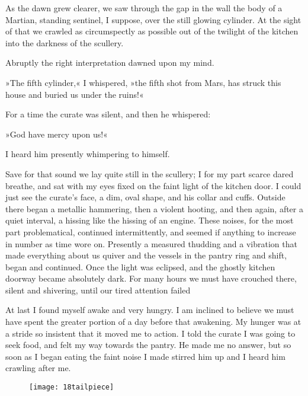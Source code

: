 As the dawn grew clearer, we saw through the gap in the wall the body of a Martian, standing sentinel, I suppose, over the still glowing cylinder. At the sight of that we crawled as circumspectly as possible out of the twilight of the kitchen into the darkness of the scullery.

Abruptly the right interpretation dawned upon my mind.

»The fifth cylinder,« I whispered, »the fifth shot from Mars, has struck this house and buried us under the ruins!«\label{cylinder5a}

For a time the curate was silent, and then he whispered:

»God have mercy upon us!«

I heard him presently whimpering to himself.

Save for that sound we lay quite still in the scullery; I for my part scarce dared breathe, and sat with my eyes fixed on the faint light of the kitchen door. I could just see the curate's face, a dim, oval shape, and his collar and cuffs. Outside there began a metallic hammering, then a violent hooting, and then again, after a quiet interval, a hissing like the hissing of an engine. These noises, for the most part problematical, continued intermittently, and seemed if anything to increase in number as time wore on. Presently a measured thudding and a vibration that made everything about us quiver and the vessels in the pantry ring and shift, began and continued. Once the light was eclipsed, and the ghostly kitchen doorway became absolutely dark. For many hours we must have crouched there, silent and shivering, until our tired attention failed\textellipsis

At last I found myself awake and very hungry. I am inclined to believe we must have spent the greater portion of a day before that awakening. My hunger was at a stride so insistent that it moved me to action. I told the curate I was going to seek food, and felt my way towards the pantry. He made me no answer, but so soon as I began eating the faint noise I made stirred him up and I heard him crawling after me.

\begin{figure}[b!]
\centering
\texttt{[image: 18tailpiece]}
\end{figure}